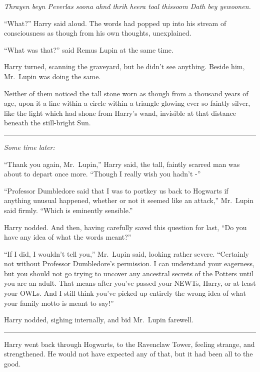 \emph{Thrayen beyn Peverlas soona ahnd thrih heera toal thissoom Dath
bey yewoonen.}

``What?'' Harry said aloud. The words had popped up into his stream of
consciousness as though from his own thoughts, unexplained.

``What was that?'' said Remus Lupin at the same time.

Harry turned, scanning the graveyard, but he didn't see anything. Beside
him, Mr.~Lupin was doing the same.

Neither of them noticed the tall stone worn as though from a thousand
years of age, upon it a line within a circle within a triangle glowing
ever so faintly silver, like the light which had shone from Harry's
wand, invisible at that distance beneath the still-bright Sun.

\begin{center}\rule{3in}{0.4pt}\end{center}

\emph{Some time later:}

``Thank you again, Mr.~Lupin,'' Harry said, the tall, faintly scarred
man was about to depart once more. ``Though I really wish you hadn't -''

``Professor Dumbledore said that I was to portkey us back to Hogwarts if
anything unusual happened, whether or not it seemed like an attack,''
Mr.~Lupin said firmly. ``Which is eminently sensible.''

Harry nodded. And then, having carefully saved this question for last,
``Do you have any idea of what the words meant?''

``If I did, I wouldn't tell you,'' Mr.~Lupin said, looking rather
severe. ``Certainly not without Professor Dumbledore's permission. I can
understand your eagerness, but you should not go trying to uncover any
ancestral secrets of the Potters until you are an adult. That means
after you've passed your NEWTs, Harry, or at least your OWLs. And I
still think you've picked up entirely the wrong idea of what your family
motto is meant to say!''

Harry nodded, sighing internally, and bid Mr.~Lupin farewell.

\begin{center}\rule{3in}{0.4pt}\end{center}

Harry went back through Hogwarts, to the Ravenclaw Tower, feeling
strange, and strengthened. He would not have expected any of that, but
it had been all to the good.

